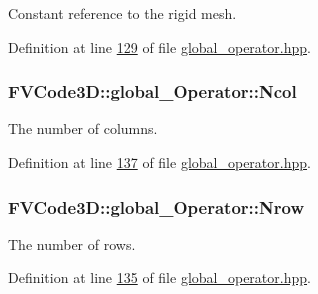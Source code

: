Constant reference to the rigid mesh. 



Definition at line \hyperlink{global__operator_8hpp_source_l00129}{129} of file \hyperlink{global__operator_8hpp_source}{global\+\_\+operator.\+hpp}.

\subsubsection[{\texorpdfstring{Ncol}{Ncol}}]{ F\+V\+Code3\+D\+::global\+\_\+\+Operator\+::\+Ncol\hspace{0.3cm}{\ttfamily [protected]}}\hypertarget{classFVCode3D_1_1global__Operator_a10945c9c802a23ee22d993424aef1ecb}{}\label{classFVCode3D_1_1global__Operator_a10945c9c802a23ee22d993424aef1ecb}


The number of columns. 



Definition at line \hyperlink{global__operator_8hpp_source_l00137}{137} of file \hyperlink{global__operator_8hpp_source}{global\+\_\+operator.\+hpp}.

\subsubsection[{\texorpdfstring{Nrow}{Nrow}}]{ F\+V\+Code3\+D\+::global\+\_\+\+Operator\+::\+Nrow\hspace{0.3cm}{\ttfamily [protected]}}\hypertarget{classFVCode3D_1_1global__Operator_a56146ab59419c1276673ab57d95bbf1c}{}\label{classFVCode3D_1_1global__Operator_a56146ab59419c1276673ab57d95bbf1c}


The number of rows. 



Definition at line \hyperlink{global__operator_8hpp_source_l00135}{135} of file \hyperlink{global__operator_8hpp_source}{global\+\_\+operator.\+hpp}.

